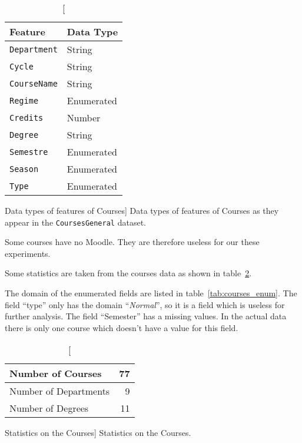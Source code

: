 \begin{table}[h!]
    \centering

    \begin{tabular}{l l}
        Feature             & Data Type  \\ \hline
        \texttt{Department} & String     \\
        \texttt{Cycle}      & String     \\
        \texttt{CourseName} & String     \\
        \texttt{Regime}     & Enumerated \\
        \texttt{Credits}    & Number     \\
        \texttt{Degree}     & String     \\
        \texttt{Semestre}   & Enumerated \\
        \texttt{Season}     & Enumerated \\
        \texttt{Type}       & Enumerated \\
    \end{tabular}

    \caption
        [Data types of features of Courses]
        {Data types of features of Courses as they appear in the
        \texttt{CoursesGeneral} dataset.}

    \label{tab:courses_general_features}
\end{table}

Some courses have no Moodle. They are therefore useless for our these
experiments.

Some statistics are taken from the courses data as shown in
table~\ref{tab:courses_stats}.

The domain of the enumerated fields are listed in table~\ref{tab:courses_enum}.
The field ``type'' only has the domain ``\textit{Normal}'', so it is a field
which is useless for further analysis. The field ``Semester'' has a missing
values. In the actual data there is only one course which doesn't have a value
for this field.

\begin{table}[h!]
    \centering

    \begin{tabular}{| l | r |}
        \hline
        Number of Courses     & 77 \\ \hline
        Number of Departments & 9  \\ \hline
        Number of Degrees     & 11 \\ \hline
    \end{tabular}

    \caption
        [Statistics on the Courses]
        {Statistics on the Courses.}

    \label{tab:courses_stats}
\end{table}

